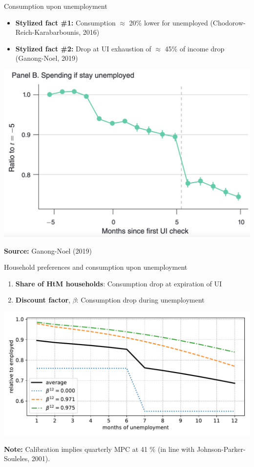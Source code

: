 \documentclass[aspectratio=169]{beamer}
\begin{document}
\begin{frame}{Consumption upon unemployment}
\label{slide:preferences}

\begin{itemize}
\item \textbf{Stylized fact \#1: }Consumption $\approx$ 20\% lower
for unemployed (Chodorow-Reich-Karabarbounis, 2016)
\item \textbf{Stylized fact \#2: }Drop at UI exhaustion of $\approx$ 45\%
of income drop (Ganong-Noel, 2019)
\end{itemize}
\begin{center}
\includegraphics[width=0.35\linewidth]{figs/Ganong19}
\par\end{center}

\begin{center}
\vspace{-3mm}\textbf{\footnotesize{}Source:}{\footnotesize{} Ganong-Noel
(2019)}{\footnotesize\par}
\par\end{center}
\hyperlink{slide:calibration}{}
\end{frame}

\begin{frame}{Household preferences and consumption upon unemployment}

\begin{enumerate}
\item \textbf{Share of HtM households}: Consumption drop at expiration of
UI
\item \textbf{Discount factor}, $\beta$: Consumption drop during unemployment
\end{enumerate}
\begin{center}
\includegraphics[width=0.8\linewidth]{results/c_upon_u}
\par\end{center}

\vspace{-4mm}\textbf{Note:} Calibration implies quarterly MPC at
41 \%
(in line with Johnson-Parker-Souleles, 2001). \hyperlink{slide:calibration}{}

\end{frame}
\end{document}
